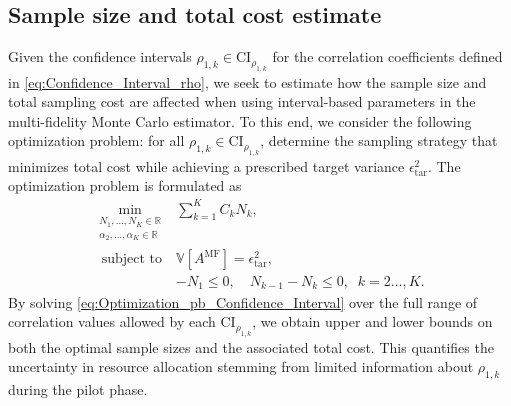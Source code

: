 

%
\subsection{Sample size and total cost estimate}
Given the confidence intervals $\rho_{1,k} \in \text{CI}_{\rho_{1,k}}$ for the correlation coefficients defined in \eqref{eq:Confidence_Interval_rho}, we seek to estimate how the sample size and total sampling cost are affected when using interval-based parameters in the multi-fidelity Monte Carlo estimator. To this end, we consider the following optimization problem: for all $\rho_{1,k} \in \text{CI}_{\rho_{1,k}}$, determine the sampling strategy that minimizes total cost while achieving a prescribed target variance $\epsilon_{\text{tar}}^2$. The optimization problem is formulated as
%
\begin{equation}\label{eq:Optimization_pb_Confidence_Interval}
    \begin{array}{ll}
    \min \limits_{\begin{array}{c}\scriptstyle N_1,\ldots, N_K\in \mathbb{R} \\[-4pt]
\scriptstyle \alpha_2,\ldots,\alpha_K\in \mathbb{R}
\end{array}} &\displaystyle\sum\limits_{k=1}^K C_kN_k,\\
       \;\,\text{subject to} &\mathbb{V}\left[A^{\text{MF}}\right]= \epsilon_{\text{tar}}^2, \\[2pt]
       &\displaystyle -N_1\le 0,\quad \displaystyle N_{k-1}-N_k\le 0, \;\; k=2\ldots,K.
    \end{array}
\end{equation}
%
By solving \eqref{eq:Optimization_pb_Confidence_Interval} over the full range of correlation values allowed by each $\text{CI}_{\rho_{1,k}}$, we obtain upper and lower bounds on both the optimal sample sizes and the associated total cost. This quantifies the uncertainty in resource allocation stemming from limited information about $\rho_{1,k}$ during the pilot phase.

